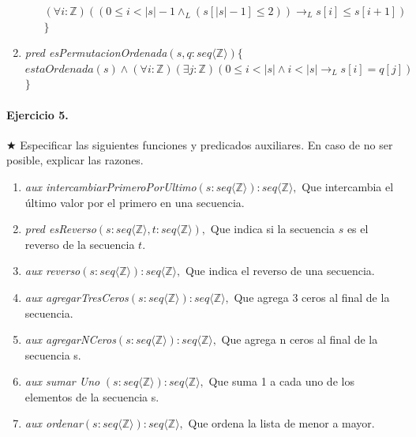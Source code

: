 \documentclass[a4paper]{article}
\begin{document}
\begin{enumerate}[label=\alph*)]
\begin{itemize}
\hspace*{6mm}$(\forall i:\mathbb{Z})((0\leq i<\vert s\vert -1 \wedge_L (s[\vert s \vert -1]\leq 2 ) )\rightarrow_L s[i]\leq s[i+1])$\\
$\}$
\end{itemize}
\item \textit{pred esPermutacionOrdenada}$(s,q: seq\langle \mathbb{Z} \rangle)\{$\\
\hspace*{6mm}$estaOrdenada(s)\wedge (\forall i:\mathbb{Z})(\exists j:\mathbb{Z})(0\leq i<\vert s\vert \wedge i<\vert s\vert\rightarrow_L s[i]= q[j])$\\
$\}$

\end{enumerate}

\paragraph{Ejercicio 5.} $\bigstar$ Especificar las siguientes funciones y predicados auxiliares. En caso de no ser posible, explicar las razones.
\begin{enumerate}[label=\alph*)]
\item \textit{aux intercambiarPrimeroPorUltimo}$(s: seq\langle \mathbb{Z} \rangle):seq\langle \mathbb{Z} \rangle,$ Que intercambia el último valor por el primero en una secuencia.
\item \textit{pred esReverso}$(s: seq\langle \mathbb{Z} \rangle , t:seq\langle \mathbb{Z} \rangle),$ Que indica si la secuencia $s$ es el reverso de la secuencia $t$.
\item \textit{aux reverso}$(s: seq\langle \mathbb{Z} \rangle):seq\langle \mathbb{Z} \rangle,$ Que indica el reverso de una secuencia.
\item \textit{aux agregarTresCeros}$(s: seq\langle \mathbb{Z} \rangle):seq\langle \mathbb{Z} \rangle,$ Que agrega 3 ceros al final de la secuencia.
\item \textit{aux agregarNCeros}$(s: seq\langle \mathbb{Z} \rangle):seq\langle \mathbb{Z} \rangle,$ Que agrega n ceros al final de la secuencia s.
\item \textit{aux sumar Uno} $(s: seq\langle \mathbb{Z} \rangle):seq\langle \mathbb{Z} \rangle,$ Que suma 1 a cada uno de los elementos de la secuencia s.
\item \textit{aux ordenar}$(s: seq\langle \mathbb{Z} \rangle):seq\langle \mathbb{Z} \rangle,$ Que ordena la lista de menor a mayor.
\end{enumerate}
\end{document}

